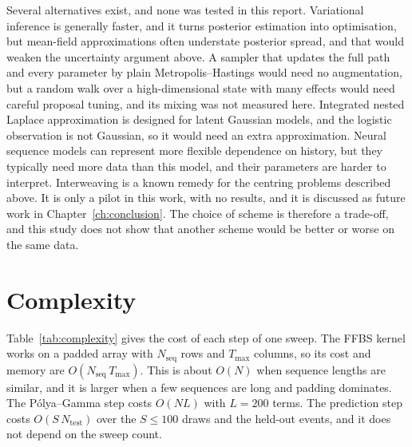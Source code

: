 Several alternatives exist, and none was tested in this report. Variational inference is generally
faster, and it turns posterior estimation into optimisation, but mean-field approximations often
understate posterior spread, and that would weaken the uncertainty argument above. A sampler that
updates the full path and every parameter by plain Metropolis--Hastings would need no augmentation,
but a random walk over a high-dimensional state with many effects would need careful proposal tuning,
and its mixing was not measured here. Integrated nested Laplace approximation is designed for latent
Gaussian models, and the logistic observation is not Gaussian, so it would need an extra
approximation. Neural sequence models can represent more flexible dependence on history, but they typically need more data than this model, and their parameters are harder to interpret.
Interweaving \cite{yu2011interweaving} is a known remedy for the centring problems described above.
It is only a pilot in this work, with no results, and it is discussed as future work in
Chapter~\ref{ch:conclusion}. The choice of scheme is therefore a trade-off, and this study does not
show that another scheme would be better or worse on the same data.

\section{Complexity}
\label{sec:method-complexity}

Table~\ref{tab:complexity} gives the cost of each step of one sweep. The FFBS kernel works on a padded array with $N_{\mathrm{seq}}$ rows and $T_{\max}$ columns, so its cost and memory are $O(N_{\mathrm{seq}}\,T_{\max})$. This is about $O(N)$ when sequence lengths are similar, and it is larger when a few sequences are long and padding dominates. The P\'olya--Gamma step costs $O(NL)$ with $L = 200$ terms. The prediction step costs $O(S\,N_{\mathrm{test}})$ over the $S \le 100$ draws and the held-out events, and it does not depend on the sweep count.

